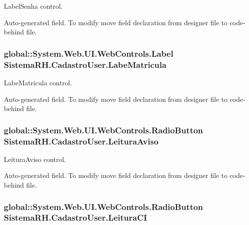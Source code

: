 LabelSenha control. 

Auto-\/generated field. To modify move field declaration from designer file to code-\/behind file. \hypertarget{class_sistema_r_h_1_1_cadastro_user_a704a4700661e48721cd40a9f0760d023}{
\subsubsection[{LabeMatricula}]{\setlength{\rightskip}{0pt plus 5cm}global::System.Web.UI.WebControls.Label {\bf SistemaRH.CadastroUser.LabeMatricula}}}
\label{class_sistema_r_h_1_1_cadastro_user_a704a4700661e48721cd40a9f0760d023}


LabeMatricula control. 

Auto-\/generated field. To modify move field declaration from designer file to code-\/behind file. \hypertarget{class_sistema_r_h_1_1_cadastro_user_a2cc5c0efea3d1e92ef8f2cc32282cb1c}{
\subsubsection[{LeituraAviso}]{\setlength{\rightskip}{0pt plus 5cm}global::System.Web.UI.WebControls.RadioButton {\bf SistemaRH.CadastroUser.LeituraAviso}}}
\label{class_sistema_r_h_1_1_cadastro_user_a2cc5c0efea3d1e92ef8f2cc32282cb1c}


LeituraAviso control. 

Auto-\/generated field. To modify move field declaration from designer file to code-\/behind file. \hypertarget{class_sistema_r_h_1_1_cadastro_user_a8946e4f8ad86ff95fccd7addf69c24c4}{
\subsubsection[{LeituraCI}]{\setlength{\rightskip}{0pt plus 5cm}global::System.Web.UI.WebControls.RadioButton {\bf SistemaRH.CadastroUser.LeituraCI}}}
\label{class_sistema_r_h_1_1_cadastro_user_a8946e4f8ad86ff95fccd7addf69c24c4}


